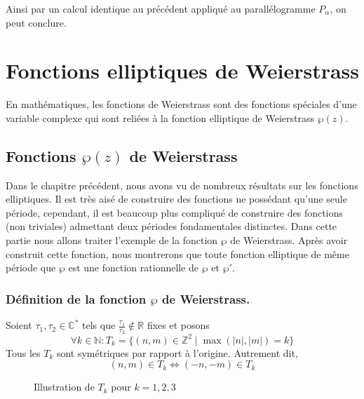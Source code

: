 \documentclass{article}
\begin{document}
Ainsi par un calcul identique au précédent appliqué au parallélogramme \( P_\alpha \), on peut conclure.

\section{Fonctions elliptiques de Weierstrass}
En mathématiques, les fonctions de Weierstrass sont des fonctions spéciales d'une variable complexe qui sont reliées à la fonction elliptique de Weierstrass $\wp(z)$.

\subsection{Fonctions $\wp(z)$ de Weierstrass}
Dans le chapitre précédent, nous avons vu de nombreux résultats sur les fonctions elliptiques. Il est très aisé de construire des fonctions ne possédant qu'une seule période, cependant, il est beaucoup plus compliqué de construire des fonctions (non triviales) admettant deux périodes fondamentales distinctes. Dans cette partie nous allons traiter l'exemple de la fonction $\wp$ de Weierstrass. Après avoir construit cette fonction, nous montrerons que toute fonction elliptique de même période que $\wp$ est une fonction rationnelle de $\wp$ et $\wp'$.

\subsubsection{Définition de la fonction $\wp$ de Weierstrass.}

Soient $\tau_1, \tau_2 \in \mathbb{C}^*$ tels que $\frac{\tau_1}{\tau_2} \notin \mathbb{R}$ fixes et posons
\[
\forall k \in \mathbb{N} : T_k = \{(n,m) \in \mathbb{Z}^2 \mid \max(|n|,|m|) = k\}
\]
Tous les $T_k$ sont symétriques par rapport à l'origine. Autrement dit,
\[
(n,m) \in T_k \iff (-n,-m) \in T_k
\]

\begin{figure}[h]
    \centering
    \caption{Illustration de \( T_k \) pour \( k=1,2,3 \)}
    \label{fig:Tk}
\end{figure}
\end{document}
